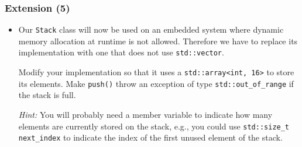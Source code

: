 \documentclass[10pt,aspectratio=169]{beamer}
\begin{document}
\begin{frame}[fragile]
  \frametitle{Extension (5)}
  \begin{itemize}
  \item Our \texttt{Stack} class will now be used on an embedded
    system where dynamic memory allocation at runtime is not allowed.
    Therefore we have to replace its implementation with one that does
    not use \verb!std::vector!.

    Modify your implementation so that it uses a
    \verb|std::array<int, 16>| to store its elements. Make
    \texttt{push()} throw an exception of type
    \verb!std::out_of_range! if the stack is full.

    \bigskip
    \emph{Hint:} You will probably need a member variable to indicate
    how many elements are currently stored on the stack, e.g., you could use
    \verb!std::size_t next_index! to indicate the index of the first
    unused element of the stack.
  \end{itemize}
\end{frame}
\end{document}
